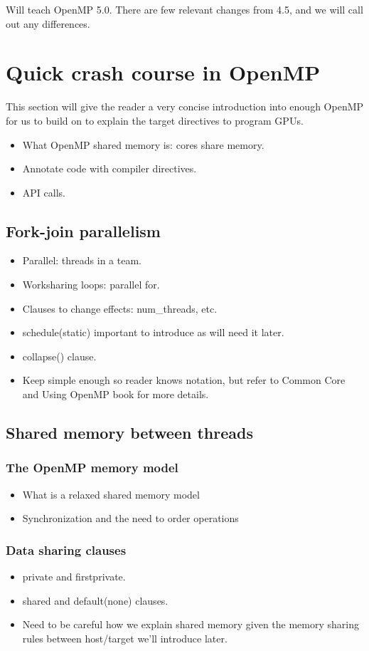 Will teach OpenMP 5.0. There are few relevant changes from 4.5, and we will call out any differences.

\section{Quick crash course in OpenMP}
This section will give the reader a very concise introduction into enough OpenMP for us to build on to explain the target directives to program GPUs.
\begin{itemize}
  \item What OpenMP shared memory is: cores share memory.
  \item Annotate code with compiler directives.
  \item API calls.
\end{itemize}

\subsection{Fork-join parallelism}
\label{ssec:fork_join}
\begin{itemize}
  \item Parallel: threads in a team.
  \item Worksharing loops: parallel for.
  \item Clauses to change effects: num\_threads, etc.
  \item schedule(static) important to introduce as will need it later.
  \item collapse() clause.
  \item Keep simple enough so reader knows notation, but refer to Common Core and Using OpenMP book for more details.
\end{itemize}

\subsection{Shared memory between threads}
\subsubsection{The OpenMP memory model}
\begin{itemize}
  \item What is a relaxed shared memory model
  \item Synchronization and the need to order operations
\end{itemize}
\subsubsection{Data sharing clauses}
\label{sssec:data_sharing}
\begin{itemize}
  \item private and firstprivate.
  \item shared and default(none) clauses.
  \item Need to be careful how we explain shared memory given the memory sharing rules between host/target we’ll introduce later.
\end{itemize}

